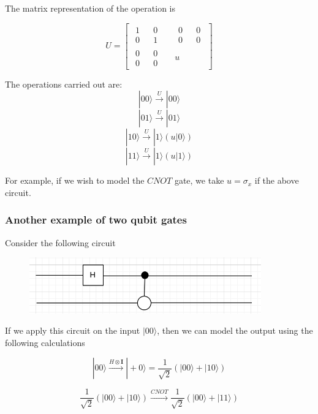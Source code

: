 \documentclass{article}
\begin{document}
The matrix representation of the operation is

$$
    U = \begin{bmatrix}
        \begin{matrix}
            1 && 0\\
            0 && 1
        \end{matrix}
        && 
        \begin{matrix}
            0 && 0\\
            0 && 0
        \end{matrix}
        \\
        \begin{matrix}
            0 && 0\\
            0 && 0
        \end{matrix}
        && 
        u
    \end{bmatrix}
$$

The operations carried out are:
$$|00\rangle \xrightarrow[]{U} |00\rangle$$
$$|01\rangle \xrightarrow[]{U} |01\rangle$$
$$|10\rangle \xrightarrow[]{U} |1\rangle(u|0\rangle)$$
$$|11\rangle \xrightarrow[]{U} |1\rangle(u|1\rangle)$$

For example, if we wish to model the $CNOT$ gate, we take $u=\sigma _x$ if the above circuit.

\subsubsection{Another example of two qubit gates}

Consider the following circuit

\begin{figure}[htp]
    \centering
    \includegraphics[width=10cm]{extwoqubit.png}
\end{figure}

If we apply this circuit on the input $|00\rangle$, then we can model the output using the following calculations

$$|00\rangle \xrightarrow[]{H \otimes \mathbf{I}} |+0\rangle = \frac{1}{\sqrt{2}}(|00\rangle + |10\rangle)$$

$$\frac{1}{\sqrt{2}}(|00\rangle + |10\rangle) \xrightarrow[]{CNOT} \frac{1}{\sqrt{2}}(|00\rangle + |11\rangle)$$
\end{document}
